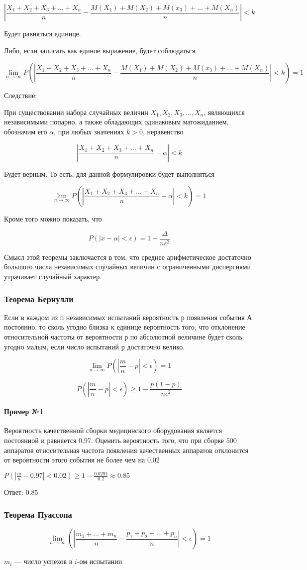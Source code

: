 \documentclass{article}
\begin{document}
$$
|\frac{X_1 + X_2 + X_3 + \dots + X_n}{n} - \frac{M(X_1) + M(X_2) + M(x_3) + \dots + M(X_n)}{n}| < k
$$

Будет равняться единице.

Либо, если записать как единое выражение, будет соблюдаться

$$
\lim\limits_{n \to \infty} P(
|\frac{X_1 + X_2 + X_3 + \dots + X_n}{n} - \frac{M(X_1) + M(X_2) + M(x_3) + \dots + M(X_n)}{n}| < k) = 1
$$

Следствие:

При существовании набора случайных величин $X_1, X_2, X_3, \dots, X_n$, являющихся независимыми попарно, а также обладающих одинаковым матожиданием, обозначим его $\alpha$, при любых значениях $k > 0$, неравенство

$$
|\frac{X_1 + X_2 + X_3 + \dots + X_n}{n} - \alpha| < k
$$

Будет верным. То есть, для данной формулировки будет выполняться

$$
\lim\limits_{n \to \infty} P(|\frac{X_1 + X_2 + X_3 + \dots + X_n}{n} - \alpha| < k) = 1
$$

Кроме того можно показать, что

$$
P(|x - \alpha| < \epsilon) = 1 - \frac{\Delta}{n \epsilon^2}
$$

Смысл этой теоремы заключается в том, что среднее арифметическое достаточно большого числа независимых случайных величин с ограниченными дисперсиями утрачивает случайный характер.

\subsubsection{Теорема Бернулли}

Если в каждом из п независимых испытаний вероятность $р$ появления события $А$ постоянно, то сколь угодно близка к единице вероятность того, что отклонение относительной частоты от вероятности $р$ по абсолютной величине будет сколь угодно малым, если число испытаний $р$ достаточно велико.

$$\lim\limits_{n \to \infty} P(|\frac{m}{n} - p| < \epsilon) = 1$$

$$P(|\frac{m}{n} - p| < \epsilon) \ge 1 - \frac{p (1 - p)}{n \epsilon^2}$$

\paragraph{Пример №1}

Вероятность качественной сборки медицинского оборудования является постоянной и равняется $0.97$. Оценить вероятность того, что при сборке $500$ аппаратов относительная частота появления качественных аппаратов отклонится от вероятности этого события не более чем на $0.02$

$P(|\frac{m}{n} - 0.97| < 0.02) \ge 1 - \frac{0.0291}{0.2} \approx 0.85$

Ответ: $0.85$

\subsubsection{Теорема Пуассона}

$$\lim\limits_{n \to \infty} (|\frac{m_1 + \dots + m_n}{n} - \frac{p_1 + p_2 + \dots + p_n}{n}| < \epsilon) = 1$$

$m_{i}$ — число успехов в $i$-ом испытании
\end{document}
